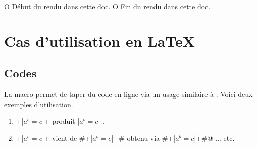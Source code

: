 

\usepackage[lang = french]{../main/main}
\usepackage{../macroenv/macroenv}
\usepackage{../inenglish/inenglish}
\usepackage{../showcase/showcase}
\usepackage{../rem-exa/rem-exa}

\usepackage{listing}





                       { O{ Début du rendu dans cette doc. }
                         O{ Fin du rendu dans cette doc. } }{
    \begin{colorstrip}{green!5}
        \smallskip
}{
        \smallskip
        \bdocextraruler{#2}
    \end{colorstrip}
}




\section{Cas d'utilisation en \LaTeX}

\subsection{Codes }

La macro  permet de taper du code en ligne via un usage similaire à .
Voici deux exemples d'utilisation.

\begin{enumerate}
    \item \bdocinlatex+\bdocinlatex|$a^b = c$|+ produit \bdocinlatex|$a^b = c$| .

    \item \bdocinlatex+\bdocinlatex|$a^b = c$|+ vient de \bdocinlatex#\bdocinlatex+\bdocinlatex|$a^b = c$|+# obtenu via \bdocinlatex@\bdocinlatex#\bdocinlatex+\bdocinlatex|$a^b = c$|+#@ ... etc.
\end{enumerate}



